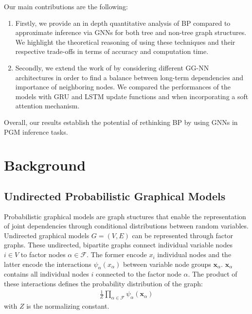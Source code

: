 \documentclass{article}
\begin{document}
Our main contributions are the following:
\begin{enumerate}
    \item Firstly, we provide an in depth quantitative analysis of BP compared to approximate inference via GNNs for both tree and non-tree graph structures. We highlight the theoretical reasoning of using these techniques and their respective trade-offs in terms of accuracy and computation time.
    \item Secondly, we extend the work of \cite{inf_pgm_gnn} by considering different GG-NN \cite{ggnn} architectures in order to find a balance between long-term dependencies and importance of neighboring nodes. We compared the performances of the models with GRU and LSTM update functions and when incorporating a soft attention mechanism.
    
\end{enumerate}

Overall, our results establish the potential of rethinking BP by using GNNs in PGM inference tasks. 
\section{Background}
\subsection{Undirected Probabilistic Graphical Models}
Probabilistic graphical models are graph stuctures that enable the representation of joint dependencies through conditional distributions between random variables. Undirected graphical models $G=(V,E)$ can be represented through factor graphs. These undirected, bipartite graphs connect individual variable nodes $i \in V$ to factor nodes $\alpha  \in \mathcal{F}$. The former encode $x_i$ individual nodes and the latter encode the interactions $\psi_\alpha(x_\alpha)$ between variable node groups $\bm{x}_\alpha$. $\bm{x}_\alpha$ contains all individual nodes $i$ connected to the factor node $\alpha$. The product of these interactions defines the probability distribution of the graph:
\begin{align*}
    \frac{1}{Z} \prod_{\alpha \in \mathcal{F}} \psi_\alpha(\bm{x}_\alpha)
\end{align*}
with $Z$ is the normalizing constant.
\end{document}
